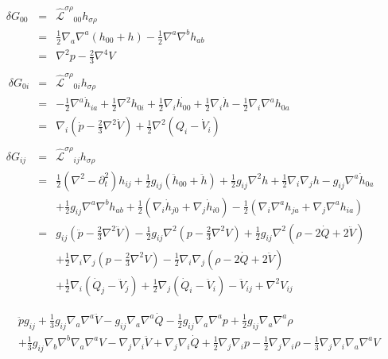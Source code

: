 \documentclass[10pt,letterpaper]{article}
\numberwithin{equation}{section}
\begin{document}
\begin{eqnarray}
\delta G_{00} &=& \mathcal{\hat L}^{\sigma\rho}{}_{00} h_{\sigma\rho}
\nonumber\\
&=& \tfrac12 \nabla_a \nabla^a(h_{00}+h) - \tfrac12 \nabla^a\nabla^b h_{ab}
\nonumber\\
&=& \nabla^2 p - \tfrac23 \nabla^4 V
\nonumber\\ \nonumber\\\
\delta G_{0i} &=& \mathcal{\hat L}^{\sigma\rho}{}_{0i} h_{\sigma\rho}
\nonumber\\
&=& -\tfrac12 \nabla^a \dot h_{ia} + \tfrac12 \nabla^2 h_{0i}+ \tfrac12 \nabla_i \dot{h_{00}} +\tfrac12 \nabla_i \dot h
-\tfrac12 \nabla_i \nabla^a h_{0a}
\nonumber\\
&=& \nabla_i \left( \dot p - \tfrac23 \nabla^2 \dot V\right) +\tfrac12 \nabla^2(Q_i-\dot V_i)
\nonumber\\ \nonumber\\
\delta G_{ij} &=& \mathcal{\hat L}^{\sigma\rho}{}_{ij} h_{\sigma\rho}
\nonumber\\
&=& \tfrac12 (\nabla^2 - \partial_t^2)h_{ij} + \tfrac12 g_{ij}(\ddot h_{00} +\ddot h) +\tfrac12 g_{ij} \nabla^2 h
+ \tfrac12 \nabla_i\nabla_j h -g_{ij} \nabla^a \dot h_{0a}
\nonumber\\
&& + \tfrac12  g_{ij} \nabla^a \nabla^b h_{ab} + \tfrac12 (\nabla_i \dot h_{j0}+\nabla_j \dot h_{i0})
-\tfrac12(\nabla_i \nabla^a h_{ja} + \nabla_j \nabla^a h_{ia})
\nonumber\\
&=& g_{ij}( \ddot p - \tfrac23 \nabla^2 \ddot V) - \tfrac12 g_{ij} \nabla^2 (p-\tfrac23 \nabla^2 V) +
\tfrac12 g_{ij}\nabla^2( \rho - 2\dot Q + 2\ddot V)
\nonumber\\
&& + \tfrac12 \nabla_i\nabla_j (p-\tfrac23 \nabla^2 V) -\tfrac12 \nabla_i\nabla_j (\rho-2\dot Q+2\ddot V)
\nonumber\\
&&+ \tfrac12 \nabla_i (\dot Q_j -\ddot V_j) + \tfrac12 \nabla_j (\dot Q_i - \ddot V_i) - \ddot V_{ij} + \nabla^2 V_{ij}
\end{eqnarray}

\begin{eqnarray}
&&\ddot{p} g_{ij} + \tfrac{1}{3} g_{ij} \nabla_{a}\nabla^{a}\ddot{V} -  g_{ij} \nabla_{a}\nabla^{a}\dot{Q} -  \tfrac{1}{2} g_{ij} \nabla_{a}\nabla^{a}p + \tfrac{1}{2} g_{ij} \nabla_{a}\nabla^{a}\rho 
\\ && + \tfrac{1}{3} g_{ij} \nabla_{b}\nabla^{b}\nabla_{a}\nabla^{a}V -  \nabla_{j}\nabla_{i}\ddot{V} + \nabla_{j}\nabla_{i}\dot{Q} + \tfrac{1}{2} \nabla_{j}\nabla_{i}p -  \tfrac{1}{2} \nabla_{j}\nabla_{i}\rho -  \tfrac{1}{3} \nabla_{j}\nabla_{i}\nabla_{a}\nabla^{a}V
\end{eqnarray}
\end{document}
